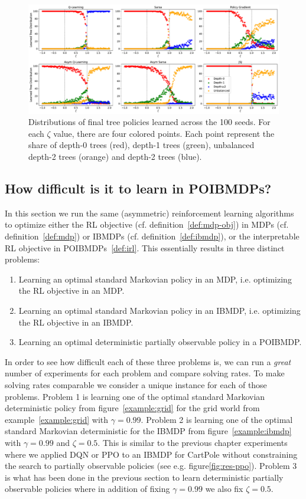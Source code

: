 \begin{figure}
    \centering
    \includegraphics[width=1\textwidth]{images/images_part1/tree_distributions.pdf}
    \caption{Distributions of final tree policies learned across the 100 seeds.
    For each $\zeta$ value, there are four colored points. Each point represent the share of depth-0 trees (red), depth-1 trees (green), unbalanced depth-2 trees (orange) and depth-2 trees (blue).
    }\label{fig:dt-distrib-poibmdp}
\end{figure}


\subsection{How difficult is it to learn in POIBMDPs?}\label{sec:how-diff}

In this section we run the same (asymmetric) reinforcement learning algorithms to optimize either the RL objective (cf. definition~\ref{def:mdp-obj}) in MDPs (cf. definition~\ref{def:mdp}) or IBMDPs (cf. definition~\ref{def:ibmdp}), or the interpretable RL objective in POIBMDPs~\ref{def:irl}.
This essentially results in three distinct problems:
\begin{enumerate}
    \item Learning an optimal standard Markovian policy in an MDP, i.e. optimizing the RL objective in an MDP.
    \item Learning an optimal standard Markovian policy in an IBMDP, i.e. optimizing the RL objective in an IBMDP.
    \item Learning an optimal deterministic partially observable policy in a POIBMDP.
\end{enumerate}

In order to see how difficult each of these three problems is, we can run a \textit{great} number of experiments for each problem and compare solving rates.
To make solving rates comparable we consider a unique instance for each of those problems.
Problem 1 is learning one of the optimal standard Markovian deterministic policy from figure~\ref{example:grid} for the grid world from example~\ref{example:grid} with $\gamma=0.99$.
Problem 2 is learning one of the optimal standard Markovian deterministic for the IBMDP from figure~\ref{example:ibmdp} with $\gamma=0.99$ and $\zeta=0.5$.
This is similar to the previous chapter experiments where we applied DQN or PPO to an IBMDP for CartPole without constraining the search to partially observable policies (see e.g. figure\ref{fig:res-ppo}).
Problem 3 is what has been done in the previous section to learn deterministic partially observable policies where in addition of fixing $\gamma=0.99$ we also fix $\zeta=0.5$.

